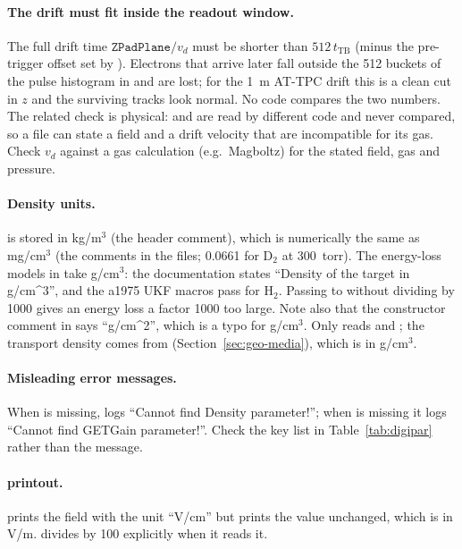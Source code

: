 \paragraph{The drift must fit inside the readout window.} The full drift time
$\mathtt{ZPadPlane}/v_d$ must be shorter than $512\,t_\mathrm{TB}$ (minus the pre-trigger offset set by
). Electrons that arrive later fall outside the 512 buckets of the pulse histogram in
 and are lost; for the 1~m AT-TPC drift this is a clean cut in $z$ and the surviving
tracks look normal. No code compares the two numbers. The related check is physical:
 and  are read by different code and never compared, so a file can
state a field and a drift velocity that are incompatible for its gas. Check $v_d$ against a gas
calculation (e.g.\ Magboltz) for the stated field, gas and pressure.

\paragraph{Density units.}  is stored in kg/m$^3$ (the header comment), which is
numerically the same as mg/cm$^3$ (the comments in the  files; 0.0661 for D$_2$ at 300~torr).
The energy-loss models in  take g/cm$^3$: the  documentation states
``Density of the target in g/cm\^{}3'', and the a1975 UKF macros pass  for H$_2$. Passing
 to  without dividing by 1000 gives an energy loss a
factor 1000 too large. Note also that the constructor comment in  says
``g/cm\^{}2'', which is a typo for g/cm$^3$. Only  reads  and
; the transport density comes from 
(Section~\ref{sec:geo-media}), which is in g/cm$^3$.

\paragraph{Misleading error messages.} When  is missing,  logs
``Cannot find Density parameter!''; when  is missing it logs ``Cannot find GETGain
parameter!''. Check the key list in Table~\ref{tab:digipar} rather than the message.

\paragraph{ printout.}  prints the field with the unit ``V/cm'' but
prints the  value unchanged, which is in V/m.  divides by 100
explicitly when it reads it.

